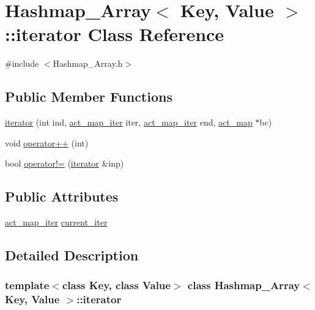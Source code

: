 \hypertarget{class_hashmap___array_1_1iterator}{
\section{Hashmap\_\-Array$<$ Key, Value $>$::iterator Class Reference}
\label{class_hashmap___array_1_1iterator}
}


{\ttfamily \#include $<$Hashmap\_\-Array.h$>$}

\subsection*{Public Member Functions}
\begin{DoxyCompactItemize}
\item 
\hyperlink{class_hashmap___array_1_1iterator_a57e9420ce0c860a340b17e78228921df}{iterator} (int ind, \hyperlink{class_hashmap___array_a0aaeec502621b4c78da9115c26797a64}{act\_\-map\_\-iter} iter, \hyperlink{class_hashmap___array_a0aaeec502621b4c78da9115c26797a64}{act\_\-map\_\-iter} end, \hyperlink{class_hashmap___array_adaad9865d64cbb9488e925a530c03786}{act\_\-map} $\ast$bc)
\item 
void \hyperlink{class_hashmap___array_1_1iterator_aeb410c0c1c0a8124273849f102eff076}{operator++} (int)
\item 
bool \hyperlink{class_hashmap___array_1_1iterator_ac18682a8d625a1ba866609c625debcdb}{operator!=} (\hyperlink{class_hashmap___array_1_1iterator}{iterator} \&inp)
\end{DoxyCompactItemize}
\subsection*{Public Attributes}
\begin{DoxyCompactItemize}
\item 
\hyperlink{class_hashmap___array_a0aaeec502621b4c78da9115c26797a64}{act\_\-map\_\-iter} \hyperlink{class_hashmap___array_1_1iterator_a5cf1825a2535c734d4b819b31f1f957c}{current\_\-iter}
\end{DoxyCompactItemize}


\subsection{Detailed Description}
\subsubsection*{template$<$class Key, class Value$>$ class Hashmap\_\-Array$<$ Key, Value $>$::iterator}

